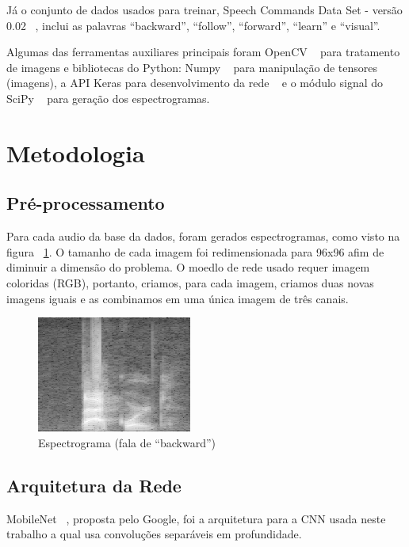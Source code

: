 \documentclass{bmvc2k}
\begin{document}
Já o conjunto de dados usados para treinar, Speech Commands Data Set - versão 0.02  ~\cite{speechcommandsv2}, inclui as palavras ``backward'', ``follow'', ``forward'', ``learn'' e ``visual''.

Algumas das ferramentas auxiliares principais foram OpenCV ~\cite{openCV} para tratamento de imagens e bibliotecas do Python: Numpy ~\cite{numpy} para manipulação de tensores (imagens), a API Keras para desenvolvimento da rede ~\cite{keras} e o módulo signal do SciPy ~\cite{scipy} para geração dos espectrogramas.


\section{Metodologia}

\subsection*{Pré-processamento}

Para cada audio da base da dados, foram gerados espectrogramas, como visto na figura ~\ref{espc}. O tamanho de cada imagem foi redimensionada para 96x96 afim de diminuir a dimensão do problema. O moedlo de rede usado requer imagem coloridas (RGB), portanto, criamos, para cada imagem, criamos duas novas imagens iguais e as combinamos em uma única imagem de três canais.


\begin{figure}[ht]
\centering
\includegraphics[scale=0.4]{imagens/spect.png} 
\caption{Espectrograma (fala de ``backward'')}
\label{espc}
\end{figure}

\subsection*{Arquitetura da Rede}

MobileNet ~\cite{mobilenets}, proposta pelo Google, foi a arquitetura para a CNN usada neste trabalho a qual usa convoluções separáveis em profundidade.
\end{document}
